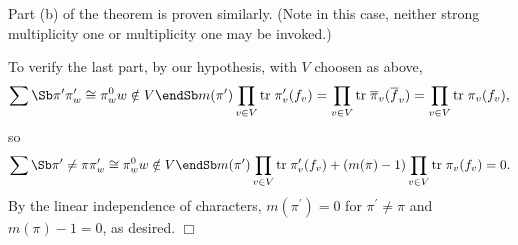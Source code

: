 Part (b) of the theorem is proven similarly. (Note in this case, neither
strong multiplicity one or multiplicity one may be invoked.)

To verify the last part, by our hypothesis, with $V$ choosen as above,
\[
\sum\Sb \pi ^{\prime } \\ \pi _w^{\prime }\cong \pi _w^0 \\
w\notin V \endSb
m(\pi ^{\prime })\prod_{v\in V}{\rm tr}\;
\pi _v^{\prime }(f_v)
=\prod_{v\in V}{\rm tr}\;\overline{\pi }_v(\overline{f}_v)
=\prod_{v\in V}{\rm tr}\;\pi_v(f_v),
\]
so 
\[
\sum\Sb \pi ^{\prime }\neq \pi  \\ \pi _w^{\prime }\cong \pi _w^0 \\ w\notin
V \endSb m(\pi ^{\prime })\prod_{v\in V}{\rm tr}\;\pi _v^{\prime
}(f_v)+(m(\pi )-1)\prod_{v\in V}{\rm tr}\;\pi _v(f_v)=0.
\]
By the linear independence of characters, $m(\pi ^{\prime })=0$ for $\pi
^{\prime }\neq \pi $ and $m(\pi )-1=0$, as desired. $\Box $



